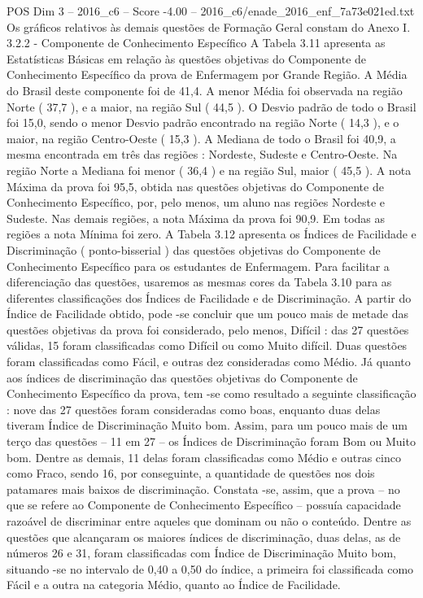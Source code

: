 \begin{textsample}{POS Dim 3 – 2016\_c6 – Score -4.00 – 2016\_c6/enade\_2016\_enf\_7a73e021ed.txt}
Os gráficos relativos às demais questões de Formação Geral constam do Anexo I. 3.2.2 - Componente de Conhecimento Específico A Tabela 3.11 apresenta as Estatísticas Básicas em relação às questões objetivas do Componente de Conhecimento Específico da prova de Enfermagem por Grande Região.
A Média do Brasil deste componente foi de 41,4.
A menor Média foi observada na região Norte ( 37,7 ), e a maior, na região Sul ( 44,5 ).
O Desvio padrão de todo o Brasil foi 15,0, sendo o menor Desvio padrão encontrado na região Norte ( 14,3 ), e o maior, na região Centro-Oeste ( 15,3 ).
A Mediana de todo o Brasil foi 40,9, a mesma encontrada em três das regiões : Nordeste, Sudeste e Centro-Oeste.
Na região Norte a Mediana foi menor ( 36,4 ) e na região Sul, maior ( 45,5 ).
A nota Máxima da prova foi 95,5, obtida nas questões objetivas do Componente de Conhecimento Específico, por, pelo menos, um aluno nas regiões Nordeste e Sudeste.
Nas demais regiões, a nota Máxima da prova foi 90,9.
Em todas as regiões a nota Mínima foi zero.
A Tabela 3.12 apresenta os Índices de Facilidade e Discriminação ( ponto-bisserial ) das questões objetivas do Componente de Conhecimento Específico para os estudantes de Enfermagem.
Para facilitar a diferenciação das questões, usaremos as mesmas cores da Tabela 3.10 para as diferentes classificações dos Índices de Facilidade e de Discriminação.
A partir do Índice de Facilidade obtido, pode -se concluir que um pouco mais de metade das questões objetivas da prova foi considerado, pelo menos, Difícil : das 27 questões válidas, 15 foram classificadas como Difícil ou como Muito difícil.
Duas questões foram classificadas como Fácil, e outras dez consideradas como Médio.
Já quanto aos índices de discriminação das questões objetivas do Componente de Conhecimento Específico da prova, tem -se como resultado a seguinte classificação : nove das 27 questões foram consideradas como boas, enquanto duas delas tiveram Índice de Discriminação Muito bom.
Assim, para um pouco mais de um terço das questões – 11 em 27 – os Índices de Discriminação foram Bom ou Muito bom.
Dentre as demais, 11 delas foram classificadas como Médio e outras cinco como Fraco, sendo 16, por conseguinte, a quantidade de questões nos dois patamares mais baixos de discriminação.
Constata -se, assim, que a prova – no que se refere ao Componente de Conhecimento Específico – possuía capacidade razoável de discriminar entre aqueles que dominam ou não o conteúdo.
Dentre as questões que alcançaram os maiores índices de discriminação, duas delas, as de números 26 e 31, foram classificadas com Índice de Discriminação Muito bom, situando -se no intervalo de 0,40 a 0,50 do índice, a primeira foi classificada como Fácil e a outra na categoria Médio, quanto ao Índice de Facilidade.

\end{textsample}
